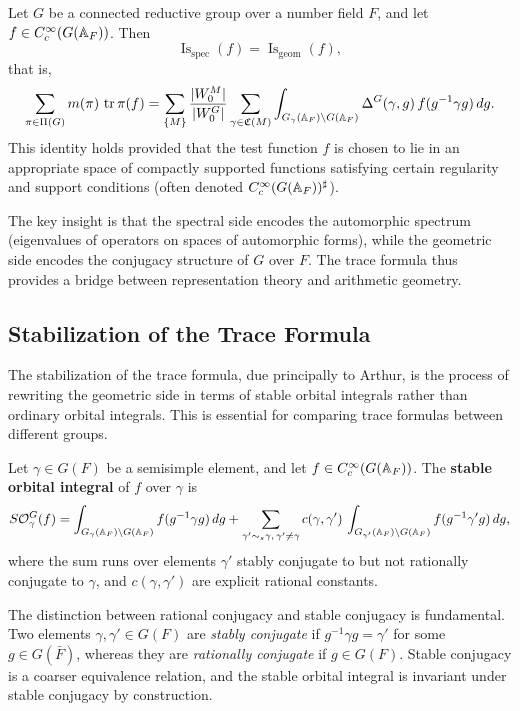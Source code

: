 \begin{theorem}
Let $G$ be a connected reductive group over a number field $F$, and let $f \in C_c^\infty(G(\mathbb{A}_F))$. Then
\[
\operatorname{Is}_{\mathrm{spec}}(f) = \operatorname{Is}_{\mathrm{geom}}(f),
\]
that is,
\[
\sum_{\pi \in \Pi(G)} m(\pi)\,\operatorname{tr}\pi(f) = \sum_{\{M\}} \frac{|W_0^M|}{|W_0^G|} \sum_{\gamma \in \mathfrak{C}(M)} \int_{G_\gamma(\mathbb{A}_F)\backslash G(\mathbb{A}_F)} \Delta^G(\gamma,g)\,f(g^{-1}\gamma g)\,dg.
\]
This identity holds provided that the test function $f$ is chosen to lie in an appropriate space of compactly supported functions satisfying certain regularity and support conditions (often denoted $C_c^\infty(G(\mathbb{A}_F))^{\sharp}$).
\end{theorem}

The key insight is that the spectral side encodes the automorphic spectrum (eigenvalues of operators on spaces of automorphic forms), while the geometric side encodes the conjugacy structure of $G$ over $F$. The trace formula thus provides a bridge between representation theory and arithmetic geometry.

\subsection{Stabilization of the Trace Formula}

The stabilization of the trace formula, due principally to Arthur, is the process of rewriting the geometric side in terms of stable orbital integrals rather than ordinary orbital integrals. This is essential for comparing trace formulas between different groups.

\begin{definition}
Let $\gamma \in G(F)$ be a semisimple element, and let $f \in C_c^\infty(G(\mathbb{A}_F))$. The \textbf{stable orbital integral} of $f$ over $\gamma$ is
\[
S\mathcal{O}_\gamma^G(f) = \int_{G_\gamma(\mathbb{A}_F)\backslash G(\mathbb{A}_F)} f(g^{-1}\gamma g)\,dg + \sum_{\gamma' \sim_s \gamma,\, \gamma' \neq \gamma} c(\gamma,\gamma')\,\int_{G_{\gamma'}(\mathbb{A}_F)\backslash G(\mathbb{A}_F)} f(g^{-1}\gamma' g)\,dg,
\]
where the sum runs over elements $\gamma'$ stably conjugate to but not rationally conjugate to $\gamma$, and $c(\gamma,\gamma')$ are explicit rational constants.
\end{definition}

\begin{remark}
The distinction between rational conjugacy and stable conjugacy is fundamental. Two elements $\gamma, \gamma' \in G(F)$ are \emph{stably conjugate} if $g^{-1}\gamma g = \gamma'$ for some $g \in G(\bar{F})$, whereas they are \emph{rationally conjugate} if $g \in G(F)$. Stable conjugacy is a coarser equivalence relation, and the stable orbital integral is invariant under stable conjugacy by construction.
\end{remark}

